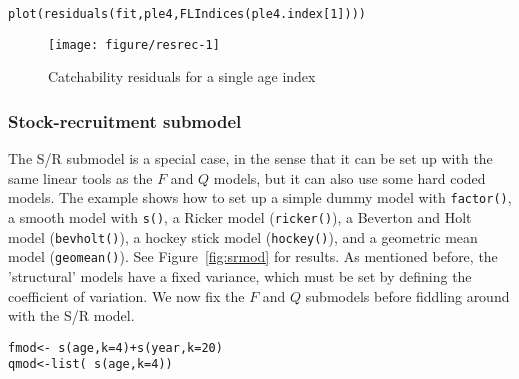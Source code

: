 \documentclass[a4paper,english,10pt]{article}\usepackage[]{graphicx}\usepackage[]{color}
\makeatletter
\def\maxwidth{ %
  \ifdim\Gin@nat@width>\linewidth
    \linewidth
  \else
    \Gin@nat@width
  \fi
}
\newcommand{\hlnum}[1]{\textcolor[rgb]{0.2,0.2,0.2}{#1}}%
\newcommand{\hlopt}[1]{\textcolor[rgb]{0.2,0.2,0.2}{#1}}%
\newcommand{\hlstd}[1]{\textcolor[rgb]{0,0,0}{#1}}%
\newcommand{\hlkwb}[1]{\textcolor[rgb]{0.361,0.506,0.596}{#1}}%
\newcommand{\hlkwc}[1]{\textcolor[rgb]{0.361,0.506,0.596}{#1}}%
\newcommand{\hlkwd}[1]{\textcolor[rgb]{0.361,0.506,0.596}{#1}}%
\newenvironment{kframe}{%
 \def\at@end@of@kframe{}%
 \ifinner\ifhmode%
  \def\at@end@of@kframe{\end{minipage}}%
  \begin{minipage}{\columnwidth}%
 \fi\fi%
 \def\FrameCommand##1{\hskip\@totalleftmargin \hskip-\fboxsep
 \colorbox{shadecolor}{##1}\hskip-\fboxsep
     \hskip-\linewidth \hskip-\@totalleftmargin \hskip\columnwidth}%
 \MakeFramed {\advance\hsize-\width
   \@totalleftmargin\z@ \linewidth\hsize
   \@setminipage}}%
 {\par\unskip\endMakeFramed%
 \at@end@of@kframe}
\newenvironment{knitrout}{}{} %
\newcommand{\code}[1]{{\texttt{#1}}}
\makeatother
\begin{document}
\begin{knitrout}
\color{fgcolor}\begin{kframe}
\begin{alltt}
\hlkwd{plot}\hlstd{(}\hlkwd{residuals}\hlstd{(fit, ple4,} \hlkwd{FLIndices}\hlstd{(ple4.index[}\hlnum{1}\hlstd{])))}
\end{alltt}
\end{kframe}\begin{figure}[H]

{\centering \texttt{[image: figure/resrec-1]} 

}

\caption[Catchability residuals for a single age index]{Catchability residuals for a single age index}\label{fig:resrec}
\end{figure}


\end{knitrout}

\subsubsection{Stock-recruitment submodel}

The S/R submodel is a special case, in the sense that it can be set up with the same linear tools as the $F$ and $Q$ models, but it can also use some hard coded models. The example shows how to set up a simple dummy model with \code{factor()}, a smooth model with \code{s()}, a Ricker model (\code{ricker()}), a Beverton and Holt model (\code{bevholt()}), a hockey stick model (\code{hockey()}), and a geometric mean model (\code{geomean()}). See Figure~\ref{fig:srmod} for results. As mentioned before, the 'structural' models have a fixed variance, which must be set by defining the coefficient of variation. We now fix the $F$ and $Q$ submodels before fiddling around with the S/R model.

\begin{knitrout}
\color{fgcolor}\begin{kframe}
\begin{alltt}
\hlstd{fmod} \hlkwb{<-} \hlopt{~} \hlkwd{s}\hlstd{(age,} \hlkwc{k}\hlstd{=}\hlnum{4}\hlstd{)} \hlopt{+} \hlkwd{s}\hlstd{(year,} \hlkwc{k} \hlstd{=} \hlnum{20}\hlstd{)}
\hlstd{qmod} \hlkwb{<-} \hlkwd{list}\hlstd{(}\hlopt{~} \hlkwd{s}\hlstd{(age,} \hlkwc{k}\hlstd{=}\hlnum{4}\hlstd{))}
\end{alltt}
\end{kframe}
\end{knitrout}
\end{document}
